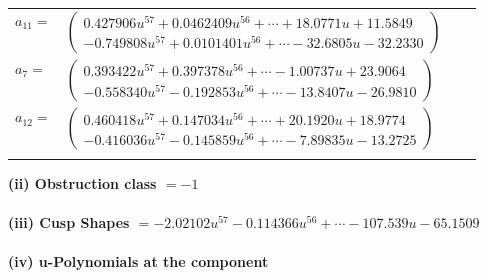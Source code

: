 \documentclass[1p]{elsarticle_modified}
\theoremstyle{definition}
\begin{document}
\begin{tabular}{m{7pt} m{180pt} m{7pt} m{180pt} }
\flushright $a_{11}=$&$\begin{pmatrix}0.427906 u^{57}+0.0462409 u^{56}+\cdots+18.0771 u+11.5849\\-0.749808 u^{57}+0.0101401 u^{56}+\cdots-32.6805 u-32.2330\end{pmatrix}$ \\
\flushright $a_{7}=$&$\begin{pmatrix}0.393422 u^{57}+0.397378 u^{56}+\cdots-1.00737 u+23.9064\\-0.558340 u^{57}-0.192853 u^{56}+\cdots-13.8407 u-26.9810\end{pmatrix}$ \\
\flushright $a_{12}=$&$\begin{pmatrix}0.460418 u^{57}+0.147034 u^{56}+\cdots+20.1920 u+18.9774\\-0.416036 u^{57}-0.145859 u^{56}+\cdots-7.89835 u-13.2725\end{pmatrix}$\\&\end{tabular}
\flushleft \textbf{(ii) Obstruction class $= -1$}\\~\\
\flushleft \textbf{(iii) Cusp Shapes $= -2.02102 u^{57}-0.114366 u^{56}+\cdots-107.539 u-65.1509$}\\~\\
\newpage\renewcommand{\arraystretch}{1}
\flushleft \textbf{(iv) u-Polynomials at the component}\newline \\
\end{document}
